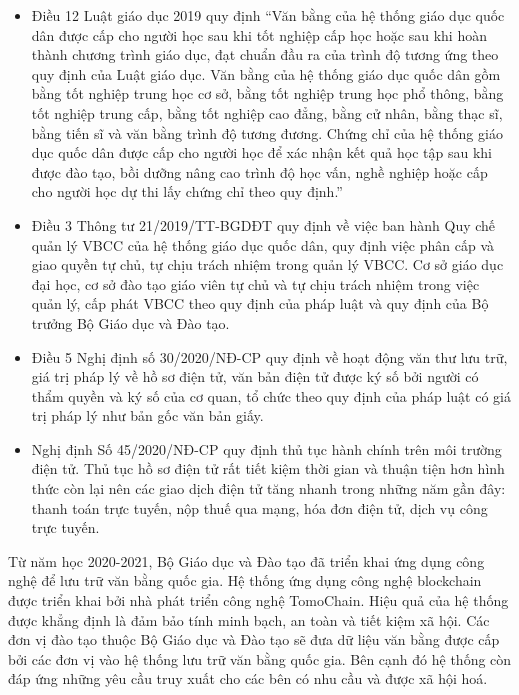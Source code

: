 \begin{itemize}
\item Điều 12 Luật giáo dục 2019 quy định “Văn bằng của hệ thống giáo dục quốc dân được cấp cho người học sau khi tốt nghiệp cấp học hoặc sau khi hoàn thành chương trình giáo dục, đạt chuẩn đầu ra của trình độ tương ứng theo quy định của Luật giáo dục. Văn bằng của hệ thống giáo dục quốc dân gồm bằng tốt nghiệp trung học cơ sở, bằng tốt nghiệp trung học phổ thông, bằng tốt nghiệp trung cấp, bằng tốt nghiệp cao đẳng, bằng cử nhân, bằng thạc sĩ, bằng tiến sĩ và văn bằng trình độ tương đương. Chứng chỉ của hệ thống giáo dục quốc dân được cấp cho người học để xác nhận kết quả học tập sau khi được đào tạo, bồi dưỡng nâng cao trình độ học vấn, nghề nghiệp hoặc cấp cho người học dự thi lấy chứng chỉ theo quy định.”

\item Điều 3 Thông tư 21/2019/TT-BGDĐT quy định về việc ban hành Quy chế quản lý VBCC của hệ thống giáo dục quốc dân, quy định việc phân cấp và giao quyền tự chủ, tự chịu trách nhiệm trong quản lý VBCC. Cơ sở giáo dục đại học, cơ sở đào tạo giáo viên tự chủ và tự chịu trách nhiệm trong việc quản lý, cấp phát VBCC theo quy định của pháp luật và quy định của Bộ trưởng Bộ Giáo dục và Đào tạo.

\item Điều 5 Nghị định số 30/2020/NĐ-CP quy định về hoạt động văn thư lưu trữ, giá trị pháp lý về hồ sơ điện tử, văn bản điện tử được ký số bởi người có thẩm quyền và ký số của cơ quan, tổ chức theo quy định của pháp luật có giá trị pháp lý như bản gốc văn bản giấy.

\item Nghị định Số 45/2020/NĐ-CP quy định thủ tục hành chính trên môi trường điện tử. Thủ tục hồ sơ điện tử rất tiết kiệm thời gian và thuận tiện hơn hình thức còn lại nên các giao dịch điện tử tăng nhanh trong những năm gần đây: thanh toán trực tuyến, nộp thuế qua mạng, hóa đơn điện tử, dịch vụ công trực tuyến.
\end{itemize}

Từ năm học 2020-2021, Bộ Giáo dục và Đào tạo đã triển khai ứng dụng công nghệ để lưu trữ văn bằng quốc gia. Hệ thống ứng dụng công nghệ blockchain được triển khai bởi nhà phát triển công nghệ TomoChain. Hiệu quả của hệ thống được khẳng định là đảm bảo tính minh bạch, an toàn và tiết kiệm xã hội. Các đơn vị đào tạo thuộc Bộ Giáo dục và Đào tạo sẽ đưa dữ liệu văn bằng được cấp bởi các đơn vị vào hệ thống lưu trữ văn bằng quốc gia. Bên cạnh đó hệ thống còn đáp ứng những yêu cầu truy xuất cho các bên có nhu cầu và được xã hội hoá.

